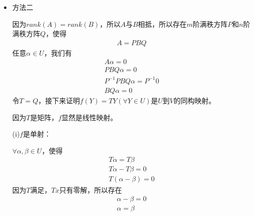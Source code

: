 \documentclass{article}
\begin{document}
\begin{itemize}
        设$U,V$的一组基分别为
        \begin{align*}
          \alpha_{i_1}, \alpha_{i_2}, \cdots, \alpha_{i_r} \ \ \ (I) \\
          \beta_{j_1}, \beta_{j_2}, \cdots, \beta_{j_r} \ \ \ (II)
        \end{align*}
        定义映射$f: U \to V$如下：
        任意$Y \in U$，我们有
        \begin{align*}
          Y = a_1 \alpha_{i_1} + a_2 \alpha_{i_2} + \cdots + a_r \alpha_{i_r}
        \end{align*}
        令
        \begin{align*}
          f(Y) = a_1 \beta_{j_1} + a_2 \beta_{j_2} + \cdots + a_r \beta_{j_r}
        \end{align*}
        因为
        \begin{align*}
          f(\alpha_{i_1}) = \beta_{j_1} \\
          f(\alpha_{i_2}) = \beta_{j_2} \\
          \vdots                        \\
          f(\alpha_{i_r}) = \beta_{j_r}
        \end{align*}
        易证$f$是线性映射，
        且$f$在$U,V$所取定的基下的矩阵为$E$，这就找到了命题中的$T = E$。

  \item 方法二

        因为$rank(A) = rank(B)$，所以$A$与$B$相抵，所以存在$m$阶满秩方阵$P$和$n$阶满秩方阵$Q$，使得
        \begin{align*}
          A = PBQ
        \end{align*}
        任意$\alpha \in U$，我们有
        \begin{align*}
          A \alpha = 0                \\
          PBQ \alpha = 0              \\
          P^{-1} PBQ \alpha = P^{-1}0 \\
          BQ \alpha = 0
        \end{align*}
        令$T = Q$，接下来证明$f(Y) = TY (\forall Y \in U)$是$U$到$V$的同构映射。

        因为$T$是矩阵，$f$显然是线性映射。

        (i)$f$是单射：

        $\forall \alpha, \beta \in U$，使得
        \begin{align*}
          T \alpha = T \beta     \\
          T \alpha - T \beta = 0 \\
          T (\alpha - \beta) = 0
        \end{align*}
        因为$T$满足，$Tx$只有零解，所以存在
        \begin{align*}
          \alpha - \beta = 0 \\
          \alpha = \beta
        \end{align*}


\end{itemize}
\end{document}
